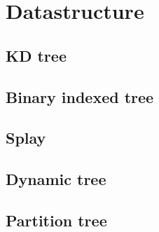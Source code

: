 \section{Datastructure}
\subsection{KD tree}


\subsection{Binary indexed tree}


\subsection{Splay}


\subsection{Dynamic tree}


\subsection{Partition tree}

